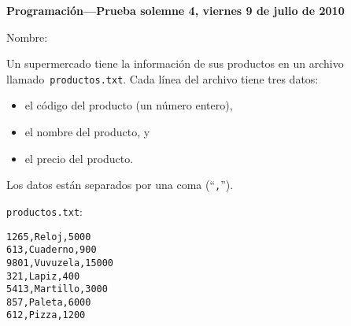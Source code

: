 \documentclass[10pt,spanish]{article}
\newcommand{\onelinerule}{\rule[2.3ex]{0pt}{0pt}}
\newcommand{\nombre}{\framebox[0.8\textwidth]{\onelinerule}}
\begin{document}
  \thispagestyle{empty}
  \pagestyle{empty}
  {\Large\bfseries Programación---Prueba solemne 4, viernes 9 de julio de 2010}

  Nombre: \nombre

  \vspace{3ex}
  \begin{minipage}[t]{.6\textwidth}
    Un supermercado tiene la información de sus productos
    en un archivo llamado~\texttt{productos.txt}.
    Cada línea del archivo tiene tres datos:
    \begin{itemize}
      \item el código del producto (un número entero),
      \item el nombre del producto, y
      \item el precio del producto.
    \end{itemize}
  Los datos están separados por una coma (``\texttt{,}'').
  \end{minipage}
  \hfill
  \begin{minipage}[t]{.3\textwidth}
    \texttt{productos.txt}:
    \begin{lstlisting}[language={},frame=single]
1265,Reloj,5000
613,Cuaderno,900
9801,Vuvuzela,15000
321,Lapiz,400
5413,Martillo,3000
857,Paleta,6000
612,Pizza,1200
    \end{lstlisting}
  \end{minipage}
\end{document}
